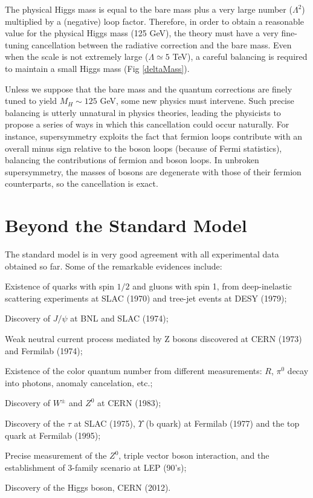 The physical Higgs mass  is equal to the bare mass plus a very large number ($\Lambda^2$) multiplied by a (negative) loop factor. Therefore, in order to obtain a reasonable value for the physical Higgs mass (125 GeV), the theory must have a very fine-tuning cancellation between the radiative correction and the bare mass. Even when the scale is not extremely large ($\Lambda \simeq 5$ TeV), a careful balancing is required to maintain a small Higgs mass (Fig \ref{deltaMass}).
 
Unless we suppose that the bare mass and the quantum corrections are finely tuned to yield $M_H\sim 125$ GeV, some new physics must intervene. Such precise balancing is utterly unnatural in physics theories, leading the physicists to propose a series of ways in which this cancellation could occur naturally. For instance, supersymmetry\cite{Martin:1997ns} exploits the fact that fermion loops contribute with an overall minus sign relative to the boson loops (because of Fermi statistics), balancing the contributions of fermion and boson loops. In unbroken supersymmetry, the masses of bosons are degenerate with those of their fermion counterparts, so the cancellation is exact.

\section{Beyond the Standard Model}

The standard model is in very good agreement with all experimental data obtained so far. Some of the remarkable evidences include:

\begin{compact_itemize}
	\item Existence of quarks with spin $1/2$ and gluons with spin 1, from deep-inelastic scattering experiments at SLAC (1970) and tree-jet events at DESY (1979); 
	\item Discovery of $J/\psi$ at BNL and SLAC (1974);
	\item Weak neutral current process mediated by Z bosons discovered at CERN (1973) and Fermilab (1974); 
	\item Existence of the color quantum number from different measurements: $R$, $\pi^0$ decay into photons,  anomaly cancelation, etc.; 
	\item Discovery of $W^\pm$ and $Z^0$ at CERN (1983);
	\item Discovery of the $\tau$ at SLAC (1975), $\Upsilon$ (b quark) at Fermilab (1977) and the top quark at Fermilab (1995);
	\item Precise measurement of the $Z^0$, triple vector boson interaction, and the establishment of 3-family scenario at LEP (90's);
	\item Discovery of the Higgs boson, CERN (2012).
\end{compact_itemize}

